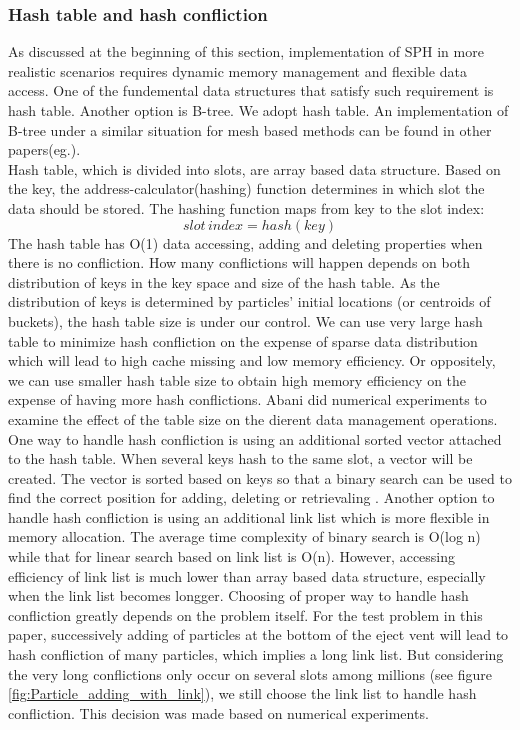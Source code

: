 \documentclass[conference,compsoc]{IEEEtran}
\begin{document}
\subsubsection{Hash table and hash confliction}
As discussed at the beginning of this section, implementation of SPH in more realistic scenarios requires dynamic memory management and flexible data access. One of the fundemental data structures that satisfy such requirement is hash table. Another option is B-tree. We adopt hash table. An implementation of B-tree under a similar situation for mesh based methods can be found in other papers(eg.\cite{patra2003data}).\\
Hash table, which is divided into slots, are array based data structure. Based on the key, the address-calculator(hashing) function determines in which slot the data should be stored. The hashing function maps from key to the slot index:
\begin{equation}
slot\,index = hash(key)
\end{equation}
The hash table has O(1) data accessing, adding and deleting properties when there is no confliction. How many conflictions will happen depends on both distribution of keys in the key space and size of the hash table. As the distribution of keys is determined by particles' initial locations (or centroids of buckets), the hash table size is under our control. We can use very large hash table to minimize hash confliction on the expense of sparse data distribution which will lead to high cache missing and low memory efficiency. Or oppositely, we can use smaller hash table size to obtain high memory efficiency on the expense of having more hash conflictions. Abani\cite{patra2003data} did numerical experiments to examine
the effect of the table size on the dierent data management operations.\\
One way to handle hash confliction is using an additional sorted vector attached to the hash table. When several keys hash to the same slot, a vector will be created. The vector is sorted based on keys so that a binary search can be used to find the correct position for adding, deleting or retrievaling . Another option to handle hash confliction is using an additional link list which is more flexible in memory allocation. The average time complexity of binary search is O(log n) while that for linear search based on link list is O(n). However, accessing efficiency of link list is much lower than array based data structure, especially when the link list becomes longger. Choosing of proper way to handle hash confliction greatly depends on the problem itself. For the test problem in this paper, successively adding of particles at the bottom of the eject vent will lead to hash confliction of many particles, which implies a long link list. But considering the very long conflictions only occur on several slots among millions (see figure \ref{fig:Particle_adding_with_link}), we still choose the link list to handle hash confliction. This decision was made based on numerical experiments.\\
\end{document}

